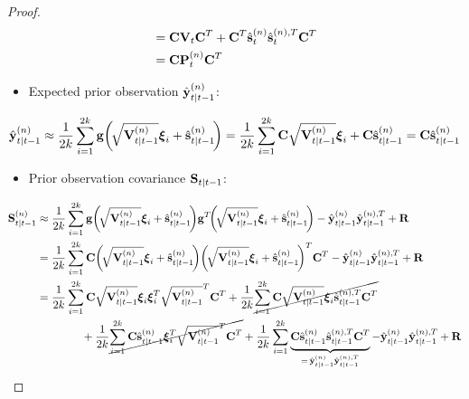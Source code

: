 \begin{proof}
\begin{align*}
				&= \boldsymbol{\mathrm{C}} \boldsymbol{\mathrm{V}}_t \boldsymbol{\mathrm{C}}^T + \boldsymbol{\mathrm{C}}^T \hat{\boldsymbol{\mathrm{s}}}_t^{(n)} \hat{\boldsymbol{\mathrm{s}}}_t^{(n), T} \boldsymbol{\mathrm{C}}^T \\
				&= \boldsymbol{\mathrm{C}} \boldsymbol{\mathrm{P}}_t^{(n)} \boldsymbol{\mathrm{C}}^T
		\end{align*}
		\begin{itemize}
			\item Expected prior observation \( \hat{\boldsymbol{\mathrm{y}}}_{t \vert t - 1}^{(n)} \):
		\end{itemize}
		\begin{align*}
			\hat{\boldsymbol{\mathrm{y}}}_{t \vert t - 1}^{(n)}
				\approx \frac{1}{2k} \sum_{i = 1}^{2k} \boldsymbol{\mathrm{g}}\bigg(\! \sqrt{\boldsymbol{\mathrm{V}}_{t \vert t - 1}^{(n)}} \boldsymbol{\mathrm{\xi}}_i + \hat{\boldsymbol{\mathrm{s}}}_{t \vert t - 1}^{(n)} \!\bigg)
				= \frac{1}{2k} \sum_{i = 1}^{2k} \boldsymbol{\mathrm{C}} \sqrt{\boldsymbol{\mathrm{V}}_{t \vert t - 1}^{(n)}} \boldsymbol{\mathrm{\xi}}_i + \boldsymbol{\mathrm{C}} \hat{\boldsymbol{\mathrm{s}}}_{t \vert t - 1}^{(n)}
				= \boldsymbol{\mathrm{C}} \hat{\boldsymbol{\mathrm{s}}}_{t \vert t - 1}^{(n)}
		\end{align*}
		\begin{itemize}
			\item Prior observation covariance \( \boldsymbol{\mathrm{S}}_{t \vert t - 1} \):
		\end{itemize}
		\begin{align*}
			\mat{S}_{t \subgiven t - 1}^{(n)}
				&\approx \frac{1}{2k} \sum_{i = 1}^{2k} \vec{g}\bigg(\!\sqrt{\mat{V}_{t \subgiven t - 1}^{(n)}} \vec{\xi}_i + \hat{\vec{s}}_{t \subgiven t - 1}^{(n)}\!\bigg) \vec{g}^T\!\bigg(\!\sqrt{\mat{V}_{t \subgiven t - 1}^{(n)}} \vec{\xi}_i + \hat{\vec{s}}_{t \subgiven t - 1}^{(n)}\!\bigg) - \hat{\vec{y}}_{t \subgiven t - 1}^{(n)}  \hat{\vec{y}}_{t \subgiven t - 1}^{(n), T} + \mat{R} \\
				&= \frac{1}{2k} \sum_{i = 1}^{2k} \mat{C} \bigg(\!\sqrt{\mat{V}_{t \subgiven t - 1}^{(n)}} \vec{\xi}_i + \hat{\vec{s}}_{t \subgiven t - 1}^{(n)}\!\bigg) \bigg(\!\sqrt{\mat{V}_{t \subgiven t - 1}^{(n)}} \vec{\xi}_i + \hat{\vec{s}}_{t \subgiven t - 1}^{(n)}\!\bigg)^T \mat{C}^T - \hat{\vec{y}}_{t \subgiven t - 1}^{(n)} \hat{\vec{y}}_{t \subgiven t - 1}^{(n), T} + \mat{R} \\
				&= \frac{1}{2k} \sum_{i = 1}^{2k} \mat{C} \sqrt{\mat{V}_{t \subgiven t - 1}^{(n)}} \vec{\xi}_i \vec{\xi}_i^T \sqrt{\mat{V}_{t \subgiven t - 1}^{(n)}}^T \mat{C}^T + \frac{1}{2k} \cancel{\sum_{i = 1}^{2k} \mat{C} \sqrt{\mat{V}_{t \subgiven t - 1}^{(n)}} \vec{\xi}_i \hat{\vec{s}}_{t \subgiven t - 1}^{(n), T} \mat{C}^T} \\
					&\qquad\qquad + \frac{1}{2k} \cancel{\sum_{i = 1}^{2k} \mat{C} \hat{\vec{s}}_{t \subgiven t - 1}^{(n)} \vec{\xi}_i^T \sqrt{\mat{V}_{t \subgiven t - 1}^{(n)}}^T \mat{C}^T} + \frac{1}{2k} \sum_{i = 1}^{2k} \underbrace{\mat{C} \hat{\vec{s}}_{t \subgiven t - 1}^{(n)} \hat{\vec{s}}_{t \subgiven t - 1}^{(n), T} \mat{C}^T}_{=\, \hat{\vec{y}}_{t \subgiven t - 1}^{(n)} \hat{\vec{y}}_{t \subgiven t - 1}^{(n), T}} - \hat{\vec{y}}_{t \subgiven t - 1}^{(n)} \hat{\vec{y}}_{t \subgiven t - 1}^{(n), T} + \mat{R} \\

\end{align*}
\end{proof}
